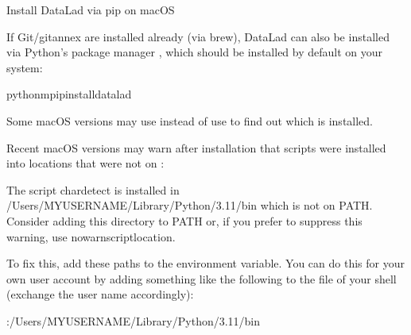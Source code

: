 \begin{findoutmore}[label={fom-macosx-pip}, before title={\thetcbcounter\ }, float, floatplacement=tb, check odd page=true]{Install DataLad via pip on macOS}
\label{\detokenize{intro/installation:fom-macosx-pip}}

\sphinxAtStartPar
If Git/git\sphinxhyphen{}annex are installed already (via brew), DataLad can also be
installed via Python’s package manager , which should be installed
by default on your system:

\begin{sphinxVerbatim}[commandchars=\\\{\}]
python\PYGZhy{}mpipinstalldatalad
\end{sphinxVerbatim}

\sphinxAtStartPar
Some macOS versions may use  instead of  \textendash{} use {\hyperref[\detokenize{glossary:term-tab-completion}]{}} to find out which is installed.

\sphinxAtStartPar
Recent macOS versions may warn after installation that scripts were installed
into locations that were not on :

\begin{sphinxVerbatim}[commandchars=\\\{\}]
The script chardetect is installed in
\PYGZsq{}/Users/MYUSERNAME/Library/Python/3.11/bin\PYGZsq{} which is not on PATH.
Consider adding this directory to PATH or, if you prefer to
suppress this warning, use \PYGZhy{}\PYGZhy{}no\PYGZhy{}warn\PYGZhy{}script\PYGZhy{}location.
\end{sphinxVerbatim}

\sphinxAtStartPar
To fix this, add these paths to the  environment variable.
You can do this for your own user account by adding something like the following
to the  file of your shell (exchange the user name accordingly):

\begin{sphinxVerbatim}[commandchars=\\\{\}]
:/Users/MYUSERNAME/Library/Python/3.11/bin
\end{sphinxVerbatim}


\end{findoutmore}
